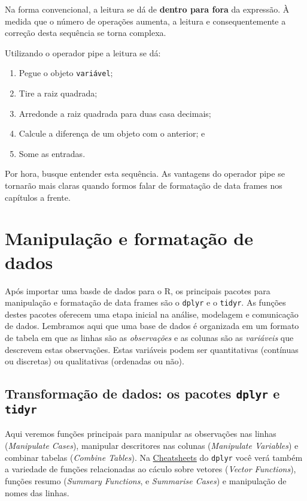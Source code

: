 \documentclass[
]{book}
\begin{document}
Na forma convencional, a leitura se dá de \textbf{dentro para fora} da expressão. À medida que o número de operações aumenta, a leitura e consequentemente a correção desta sequência se torna complexa.

Utilizando o operador pipe a leitura se dá:

\begin{enumerate}
\def\labelenumi{\arabic{enumi}.}
\item
  Pegue o objeto \texttt{variável};
\item
  Tire a raiz quadrada;
\item
  Arredonde a raiz quadrada para duas casa decimais;
\item
  Calcule a diferença de um objeto com o anterior; e
\item
  Some as entradas.
\end{enumerate}

Por hora, busque entender esta sequência. As vantagens do operador pipe se tornarão mais claras quando formos falar de formatação de data frames nos capítulos a frente.

\hypertarget{format}{%
\chapter{Manipulação e formatação de dados}\label{format}}

Após importar uma basde de dados para o R, os principais pacotes para manipulação e formatação de data frames são o \texttt{dplyr} e o \texttt{tidyr}. As funções destes pacotes oferecem uma etapa inicial na análise, modelagem e comunicação de dados. Lembramos aqui que uma base de dados é organizada em um formato de tabela em que as linhas são as \emph{observações} e as colunas são as \emph{variáveis} que descrevem estas observações. Estas variáveis podem ser quantitativas (contínuas ou discretas) ou qualitativas (ordenadas ou não).

\hypertarget{transformauxe7uxe3o-de-dados-os-pacotes-dplyr-e-tidyr}{%
\section{\texorpdfstring{Transformação de dados: os pacotes \texttt{dplyr} e \texttt{tidyr}}{Transformação de dados: os pacotes dplyr e tidyr}}\label{transformauxe7uxe3o-de-dados-os-pacotes-dplyr-e-tidyr}}

Aqui veremos funções principais para manipular as observações nas linhas (\emph{Manipulate Cases}), manipular descritores nas colunas (\emph{Manipulate Variables}) e combinar tabelas (\emph{Combine Tables}). Na \href{https://rstudio.com/resources/cheatsheets/}{Cheatsheets} do \texttt{dplyr} você verá também a variedade de funções relacionadas ao cáculo sobre vetores (\emph{Vector Functions}), funções resumo (\emph{Summary Functions}, e \emph{Summarise Cases}) e manipulação de nomes das linhas.
\end{document}
